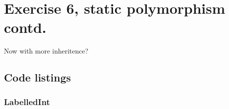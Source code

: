 \documentclass[11pt]{article}
\begin{document}
\section*{Exercise 6, static polymorphism contd.}
Now with more inheritence?

\subsection*{Code listings}




\subsubsection*{LabelledInt}


\end{document}
